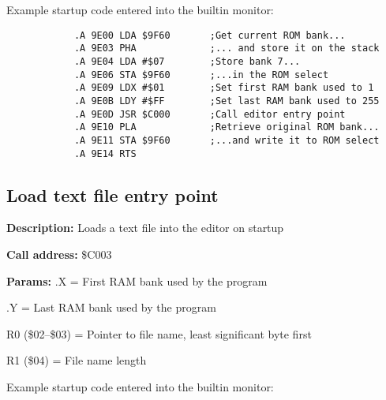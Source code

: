 \documentclass{article}
\begin{document}
        \vspace{1em}Example startup code entered into the builtin monitor:

        \begin{verbatim}
            .A 9E00 LDA $9F60       ;Get current ROM bank...
            .A 9E03 PHA             ;... and store it on the stack
            .A 9E04 LDA #$07        ;Store bank 7...
            .A 9E06 STA $9F60       ;...in the ROM select
            .A 9E09 LDX #$01        ;Set first RAM bank used to 1
            .A 9E0B LDY #$FF        ;Set last RAM bank used to 255
            .A 9E0D JSR $C000       ;Call editor entry point
            .A 9E10 PLA             ;Retrieve original ROM bank...
            .A 9E11 STA $9F60       ;...and write it to ROM select
            .A 9E14 RTS
        \end{verbatim}

    \subsection{Load text file entry point}

        \begin{hangparas}{3cm}{1}

            \textbf{Description:} \tabto{3cm} Loads a text file into the editor on startup

            \textbf{Call address:} \tabto{3cm}\$C003

            \textbf{Params:} \tabto{3cm}.X = First RAM bank used by the program
        
            \tabto{3cm} .Y = Last RAM bank used by the program

            \tabto{3cm} R0 (\$02--\$03) = Pointer to file name, least significant byte first

            \tabto{3cm} R1 (\$04) = File name length

        \end{hangparas}

        \vspace{1em}Example startup code entered into the builtin monitor:
\end{document}
